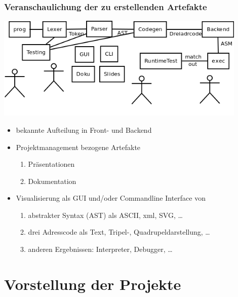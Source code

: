 \documentclass[ucs,9pt]{beamer}
\begin{document}
\begin{frame}
    \frametitle{Veranschaulichung der zu erstellenden Artefakte}
    \begin{center}
        \includegraphics[width=0.9\textwidth]{pipeline}
    \end{center}
    \begin{itemize}
        \item bekannte Aufteilung in Front- und Backend
        \item Projektmanagement bezogene Artefakte
            \begin{enumerate}
                \item Präsentationen
                \item Dokumentation
            \end{enumerate}
        \item Visualisierung als GUI und/oder Commandline Interface von
            \begin{enumerate}
                \item abstrakter Syntax (AST) als ASCII, xml, SVG, \dots
                \item drei Adresscode als Text, Tripel-, Quadrupeldarstellung,
                    \dots
                \item anderen Ergebnissen: Interpreter, Debugger, \dots
            \end{enumerate}
    \end{itemize}
\end{frame}

\section{Vorstellung der Projekte}
\end{document}
